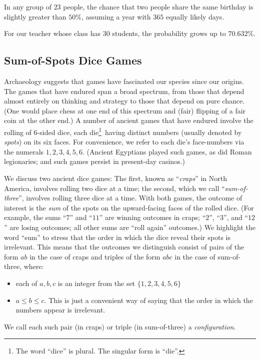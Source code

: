 \begin{prop}
In any group of $23$ people, the chance that two people share the same
birthday is slightly greater than $50\%$, assuming a year with $365$
equally likely days.
\end{prop}

For our teacher whose class has 30 students, the probability grows up
to $70.632\%$.


\subsection{Sum-of-Spots Dice Games}
\label{sec:three-dice}

Archaeology suggests that games have fascinated our species since our
origins.  The games that have endured span a broad spectrum, from
those that depend almost entirely on thinking and strategy to those
that depend on pure chance.  (One would place chess at one end of this
spectrum and (fair) flipping of a fair coin at the other end.)  A
number of ancient games that have endured involve the rolling of
6-sided dice, each die\footnote{The word ``dice'' is plural.  The
  singular form is ``die''.}~having distinct numbers (usually denoted
by {\it spots}) on its six faces.  For convenience, we refer to each
die's face-numbers via the numerals $1, 2, 3, 4, 5, 6$.  (Ancient
Egyptians played such games, as did Roman legionaries; and such games
persist in present-day casinos.)

We discuss two ancient dice games: The first, known as ``{\it craps}''
 in North America, involves rolling two dice
at a time; the second, which we call ``{\it sum-of-three}'',
 involves rolling three dice at a time.
With both games, the outcome of interest is the {\em sum} of the spots
on the upward-facing faces of the rolled dice.  (For example, the sums
``$7$'' and ``$11$'' are winning outcomes in craps; ``$2$'', ``$3$'',
and ``$12$'' are losing outcomes; all other sums are ``roll again''
outcomes.)  We highlight the word ``sum'' to stress that the order in
which the dice reveal their spots is irrelevant.  This means that the
outcomes we distinguish consist of pairs of the form $ab$ in the case
of craps and triples of the form $abc$ in the case of sum-of-three,
where:
\begin{itemize}
\item
each of $a, b, c$ is an integer from the set $\{1, 2, 3, 4, 5, 6\}$
\item
$ a \leq b \leq c$.  This is just a convenient way of saying that the
  order in which the numbers appear is irrelevant.
\end{itemize}
We call each such pair (in craps) or triple (in sum-of-three) a {\it
  configuration}.

